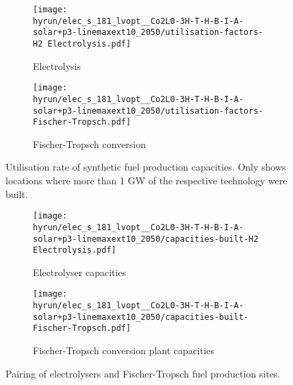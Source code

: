 \begin{figure}
    \centering
    \begin{subfigure}{0.66\textwidth}
        \centering
        \caption{Electrolysis}
        \texttt{[image: \\hyrun/elec\_s\_181\_lvopt\_\_Co2L0-3H-T-H-B-I-A-solar+p3-linemaxext10\_2050/utilisation-factors-H2 Electrolysis.pdf]}
    \end{subfigure}
    \begin{subfigure}{0.66\textwidth}
        \centering
        \caption{Fischer-Tropsch conversion}
        \texttt{[image: \\hyrun/elec\_s\_181\_lvopt\_\_Co2L0-3H-T-H-B-I-A-solar+p3-linemaxext10\_2050/utilisation-factors-Fischer-Tropsch.pdf]}
    \end{subfigure}
    \caption{Utilisation rate of synthetic fuel production capacities. Only shows locations where more than 1 GW of the respective technology were built.}
    \label{fig:si:utilisation-rate-map}
\end{figure}

\begin{figure}
    \centering
    \begin{subfigure}{0.66\textwidth}
        \centering
        \caption{Electrolyser capacities}
        \texttt{[image: \\hyrun/elec\_s\_181\_lvopt\_\_Co2L0-3H-T-H-B-I-A-solar+p3-linemaxext10\_2050/capacities-built-H2 Electrolysis.pdf]}
    \end{subfigure}
    \begin{subfigure}{0.66\textwidth}
        \centering
        \caption{Fischer-Tropsch conversion plant capacities}
        \texttt{[image: \\hyrun/elec\_s\_181\_lvopt\_\_Co2L0-3H-T-H-B-I-A-solar+p3-linemaxext10\_2050/capacities-built-Fischer-Tropsch.pdf]}
    \end{subfigure}
    \caption{Pairing of electrolysers and Fischer-Tropsch fuel production sites. }
    \label{fig:si:colocation}
\end{figure}


